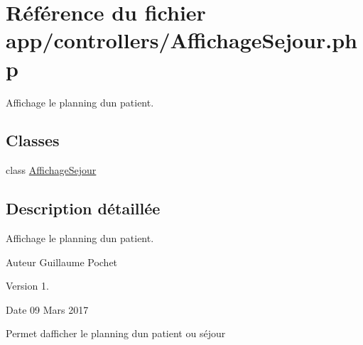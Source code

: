 \hypertarget{_affichage_sejour_8php}{}\section{Référence du fichier app/controllers/\+Affichage\+Sejour.php}
\label{_affichage_sejour_8php}


Affichage le planning d\textquotesingle{}un patient.  


\subsection*{Classes}
\begin{DoxyCompactItemize}
\item 
class \hyperlink{class_affichage_sejour}{Affichage\+Sejour}
\end{DoxyCompactItemize}


\subsection{Description détaillée}
Affichage le planning d\textquotesingle{}un patient. 

\begin{DoxyAuthor}{Auteur}
Guillaume Pochet 
\end{DoxyAuthor}
\begin{DoxyVersion}{Version}
1. 
\end{DoxyVersion}
\begin{DoxyDate}{Date}
09 Mars 2017
\end{DoxyDate}
Permet d\textquotesingle{}afficher le planning d\textquotesingle{}un patient ou séjour 
